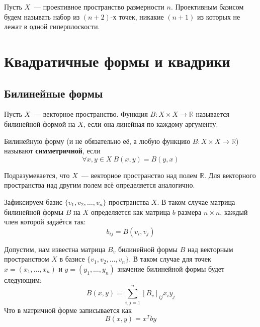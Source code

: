 \documentclass[11pt]{article}
\begin{document}
    \begin{definition}
        Пусть $X$~--- проективное пространство размерности $n$.  Проективным базисом будем называть набор из  $(n + 2)$-х точек, никакие $(n + 1)$ из которых не лежат в одной  гиперплоскости.
    \end{definition}

    \section{Квадратичные формы и квадрики}
    \subsection{Билинейные формы}

    \begin{definition}
    Пусть $X$~--- векторное пространство. Функция $B: X \times X \to \mathbb{R}$ называется билинейной формой на $X$, если она линейная по каждому аргументу.
    \end{definition}

    \begin{remark}
    Билинейную форму (и не обязательно её, а любую функцию $B: X \times X \to \mathbb{R}$) называют \textbf{симметричной}, если
    \begin{equation*}
        \forall x, y \in X \ B(x, y) = B(y, x)
    \end{equation*}
    \end{remark}

    \begin{remark}
    Подразумевается, что $X$~--- векторное пространство над полем $\mathbb{R}$. Для векторного пространства над другим полем всё определяется аналогично.
    \end{remark}

    \begin{definition}
    Зафиксируем базис $\{v_1, v_2, \hdots, v_n\}$ пространства $X$. В таком случае матрица билинейной формы $B$ на $X$ определяется как матрица $b$ размера $n \times n$, каждый член которой задаётся так:
    \begin{equation*}
        b_{ij} = B(v_i, v_j)
    \end{equation*}
    \end{definition}

    \begin{remark}
    Допустим, нам известна матрица $B_{v}$ билинейной формы $B$ над векторным пространством $X$ в базисе $\{v_1, v_2, \hdots, v_n\}$. В таком случае для точек $x = (x_1, \hdots, x_n)$ и $y = (y_1, \hdots, y_n)$ значение билинейной формы будет следующим:
    \begin{equation*}
        B(x, y) = \sum_{i, j = 1}^{n} [B_{v}]_{ij} x_i y_j
    \end{equation*}
    Что в матричной форме записывается как
    \begin{equation*}
        B(x, y) = x^{T} b y
    \end{equation*}
    \end{remark}
\end{document}
